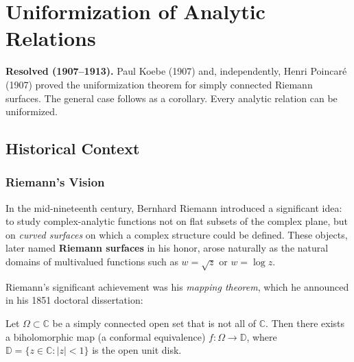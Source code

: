 
\chapter{Uniformization of Analytic Relations}

\begin{solvedbox}
\textbf{Resolved (1907--1913).} Paul Koebe (1907) and, independently, Henri Poincar\'e (1907) proved the uniformization theorem for simply connected Riemann surfaces. The general case follows as a corollary. Every analytic relation can be uniformized.
\end{solvedbox}

\section{Historical Context}

\subsection{Riemann's Vision}

In the mid-nineteenth century, Bernhard Riemann introduced a significant idea: to study complex-analytic functions not on flat subsets of the complex plane, but on \emph{curved surfaces} on which a complex structure could be defined. These objects, later named \textbf{Riemann surfaces} in his honor, arose naturally as the natural domains of multivalued functions such as $w = \sqrt{z}$ or $w = \log z$.

Riemann's significant achievement was his \emph{mapping theorem}, which he announced in his 1851 doctoral dissertation:

\begin{theorem}\label{thm:riemann-mapping}
Let $\Omega \subset \mathbb{C}$ be a simply connected open set that is not all of $\mathbb{C}$. Then there exists a biholomorphic map (a conformal equivalence) $f \colon \Omega \to \mathbb{D}$, where $\mathbb{D} = \{z \in \mathbb{C} : |z| < 1\}$ is the open unit disk.
\end{theorem}


